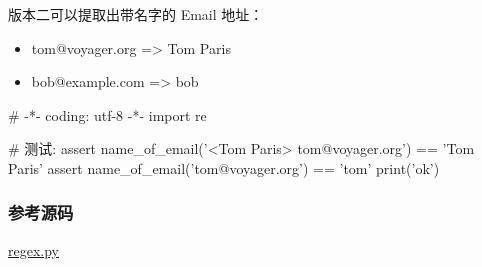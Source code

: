 版本二可以提取出带名字的 Email 地址：

\begin{itemize}
\item
  tom@voyager.org =\textgreater{} Tom Paris
\item
  bob@example.com =\textgreater{} bob
\end{itemize}

\begin{pythoncode}
# -*- coding: utf-8 -*-
import re
\end{pythoncode}

\begin{pythoncode}
# 测试:
assert name_of_email('<Tom Paris> tom@voyager.org') == 'Tom Paris'
assert name_of_email('tom@voyager.org') == 'tom'
print('ok')
\end{pythoncode}

\hypertarget{ux53c2ux8003ux6e90ux7801}{%
\subsubsection{参考源码}\label{ux53c2ux8003ux6e90ux7801}}

\href{https://github.com/michaelliao/learn-python3/blob/master/samples/regex/regex.py}{regex.py}

